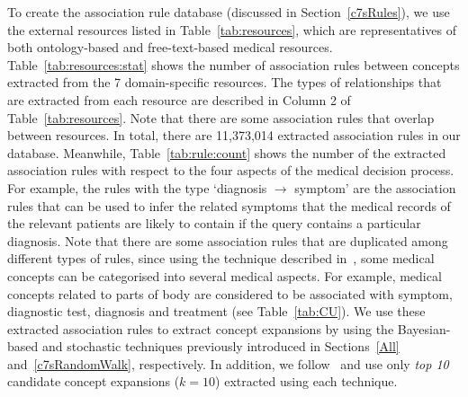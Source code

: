 \documentclass[1p]{elsarticle}
\begin{document}
To create the association rule database (discussed in Section~\ref{c7sRules}), we use the external resources listed in Table~\ref{tab:resources}, which are representatives of both ontology-based and free-text-based medical resources. Table~\ref{tab:resources:stat} shows the number of association rules between concepts extracted from the 7 domain-specific resources. The types of relationships that are extracted from each resource are described in Column 2 of Table~\ref{tab:resources}. Note that there are some association rules that overlap between resources. In total, there are 11,373,014 extracted association rules in our database. Meanwhile, Table~\ref{tab:rule:count} shows the number of the extracted association rules with respect to the four aspects of the medical decision process. For example, the rules with the type `diagnosis $\rightarrow$ symptom' are the association rules that can be used to infer the related symptoms that the medical records of the relevant patients are likely to contain if the query contains a particular diagnosis. Note that there are some association rules that are duplicated among different types of rules, since using the technique described in~\cite{limsopatham2013ecir-b}, some medical concepts can be categorised into several medical aspects. For example, medical concepts related to parts of body are considered to be associated with symptom, diagnostic test, diagnosis and treatment (see Table~\ref{tab:CU}). We use these extracted association rules to extract concept expansions by using the Bayesian-based and stochastic techniques previously introduced in Sections~\ref{All} and~\ref{c7sRandomWalk}, respectively. In addition, we follow~\cite{amati2003thesis} and use only \emph{top 10} candidate concept expansions ($k=10$) extracted using each technique.
\end{document}
